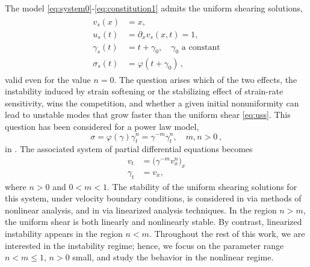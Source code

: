 \documentclass[a4paper,11pt]{article}
\def\red{\color{red}}
\def\red{\color{red}}
\numberwithin{step}{dummy}
\begin{document}
The model \eqref{eq:system0}-\eqref{eq:constitution1} admits the uniform shearing solutions, 
\begin{align} \label{eq:uss}
 \begin{aligned}
  v_s(x) &= x, \\
  u_s(t) &= \partial_x v_s(x,t) = 1,\\
  \gamma_s(t) &= t + \gamma_0, \quad \text{$\gamma_0$ a constant}\\
  \sigma_s(t) &= \varphi(t+\gamma_0) \, , 
 \end{aligned}
\end{align}
valid even for the value $n=0$. 
The question arises which of the two effects, the instability induced by strain softening or the stabilizing effect of strain-rate sensitivity, 
wins the competition, and whether a given initial nonuniformity can lead 
to unstable modes that grow faster than the uniform shear \eqref{eq:uss}. 
This question has been considered for a power law model,
\begin{equation} \label{eq:constitution2}
 \sigma = \varphi(\gamma)\gamma_t^n = \gamma^{-m}\gamma_t^n, \quad m,n>0 \, ,
\end{equation}
in  \cite{HN77, molinari_analytical_1987, tzavaras_strain_1991}.
The associated system of partial differential equations becomes
\begin{equation} \label{eq:system}
 \begin{aligned}
   v_t & =\big(\gamma^{-m} v_x^n\big)_x \\
   \gamma_t&=v_x, 
 \end{aligned}
\end{equation}
where $n > 0$ and $0 < m < 1$. 
The stability of the uniform shearing solutions for this system, under velocity boundary conditions, is considered
in \cite{tzavaras_plastic_1986, tzavaras_strain_1991} via methods of nonlinear analysis, and in 
\cite{clifton_critical_1984, fressengeas_instability_1987, molinari_analytical_1987, tzavaras_nonlinear_1992} 
via linearized analysis techniques. 
In the region $n>m$, the uniform shear is both linearly and nonlinearly stable.
By contrast, linearized instability appears in the region $n < m$. Throughout the rest of this work, we are interested in the instability regime; hence, we focus on the parameter  range $n < m \le 1$, $n > 0$ small, and study
the behavior in the nonlinear regime. 



\end{document}
